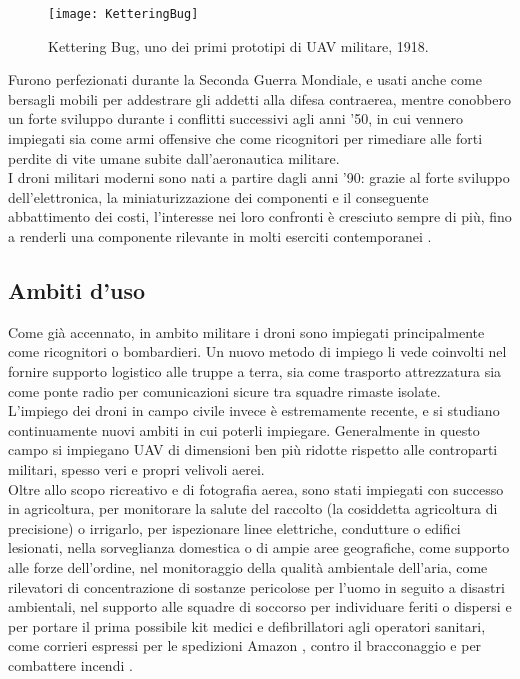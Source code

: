 \begin{wrapfigure}{R}{0.5\textwidth}
	\begin{center}
		\texttt{[image: KetteringBug]}
	\end{center}
	\caption{Kettering Bug, uno dei primi prototipi di UAV militare, 1918.} \label{fig:Kettering_Bug}
\end{wrapfigure}

Furono perfezionati durante la Seconda Guerra Mondiale, e usati anche come bersagli mobili per addestrare gli addetti alla difesa contraerea, mentre conobbero un forte sviluppo durante i conflitti successivi agli anni '50, in cui vennero impiegati sia come armi offensive che come ricognitori per rimediare alle forti perdite di vite umane subite dall'aeronautica militare.  \\
I droni militari moderni sono nati a partire dagli anni '90: grazie al forte sviluppo dell'elettronica, la miniaturizzazione dei componenti e il conseguente abbattimento dei costi, l'interesse nei loro confronti è cresciuto sempre di più, fino a renderli una componente rilevante in molti eserciti contemporanei \cite{keane2013brief}.

\subsection[Ambiti d'uso]{Ambiti d'uso}
Come già accennato, in ambito militare i droni sono impiegati principalmente come ricognitori o bombardieri. 
Un nuovo metodo di impiego li vede coinvolti nel fornire supporto logistico alle truppe a terra, sia come trasporto attrezzatura sia come ponte radio per comunicazioni sicure tra squadre rimaste isolate. \\
L'impiego dei droni in campo civile invece è estremamente recente, e si studiano continuamente nuovi ambiti in cui poterli impiegare. 
Generalmente in questo campo si impiegano UAV di dimensioni ben più ridotte rispetto alle controparti militari, spesso veri e propri velivoli aerei. \\
Oltre allo scopo ricreativo e di fotografia aerea, sono stati impiegati con successo in agricoltura, per monitorare la salute del raccolto (la cosiddetta agricoltura di precisione) o irrigarlo, per ispezionare linee elettriche, condutture o edifici lesionati, nella sorveglianza domestica o di ampie aree geografiche, come supporto alle forze dell'ordine, nel monitoraggio della qualità ambientale dell'aria, come rilevatori di concentrazione di sostanze pericolose per l'uomo in seguito a disastri ambientali, nel supporto alle squadre di soccorso per individuare feriti o dispersi e per portare il prima possibile kit medici e defibrillatori agli operatori sanitari, come corrieri espressi per le spedizioni Amazon \cite{amazon}, contro il bracconaggio e per combattere incendi \cite{dronespeak}. 

